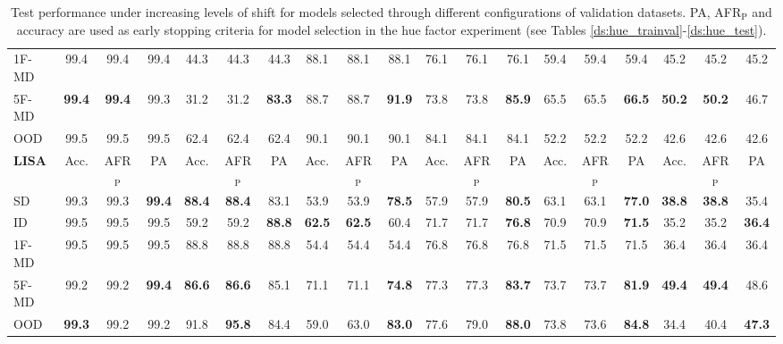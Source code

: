 \begin{table}[H]
{\begin{tabular}{l|ccc|ccc|ccc|ccc|ccc|ccc}
    1F-MD & 99.4 & 99.4 & 99.4 & 44.3 & 44.3 & 44.3 & 88.1 & 88.1 & 88.1 & 76.1 & 76.1 & 76.1 & 59.4 & 59.4 & 59.4 & 45.2 & 45.2 & 45.2 \\
    5F-MD & {\textbf{99.4}} & \textbf{99.4} & 99.3 & 31.2 & 31.2 & {\textbf{83.3}} & 88.7 & 88.7 & {\textbf{91.9}} & 73.8 & 73.8 & {\textbf{85.9}} & 65.5 & 65.5 & {\textbf{66.5}} & {\textbf{50.2}} & \textbf{50.2} & 46.7 \\
    OOD & 99.5 & 99.5 & 99.5 & 62.4 & 62.4 & 62.4 & 90.1 & 90.1 & 90.1 & 84.1 & 84.1 & 84.1 & 52.2 & 52.2 & 52.2 & 42.6 & 42.6 & 42.6 \\
    \midrule
    \addlinespace
    \addlinespace
    \textbf{{\color{tab:green} \textbf{LISA}}} & Acc. & AFR$_\text{P}$ & PA & Acc. & AFR$_\text{P}$ & PA & Acc. & AFR$_\text{P}$ & PA & Acc. & AFR$_\text{P}$ & PA & Acc. & AFR$_\text{P}$ & PA & Acc. & AFR$_\text{P}$ & PA \\
    \midrule
    SD & 99.3 & 99.3 & {\textbf{99.4}} & {\textbf{88.4}} & \textbf{88.4} & 83.1 & 53.9 & 53.9 & {\textbf{78.5}} & 57.9 & 57.9 & {\textbf{80.5}} & 63.1 & 63.1 & {\textbf{77.0}} & {\textbf{38.8}} & \textbf{38.8} & 35.4 \\
    ID & 99.5 & 99.5 & 99.5 & 59.2 & 59.2 & {\textbf{88.8}} & {\textbf{62.5}} & \textbf{62.5} & 60.4 & 71.7 & 71.7 & {\textbf{76.8}} & 70.9 & 70.9 & {\textbf{71.5}} & 35.2 & 35.2 & {\textbf{36.4}} \\
    1F-MD & 99.5 & 99.5 & 99.5 & 88.8 & 88.8 & 88.8 & 54.4 & 54.4 & 54.4 & 76.8 & 76.8 & 76.8 & 71.5 & 71.5 & 71.5 & 36.4 & 36.4 & 36.4 \\
    5F-MD & 99.2 & 99.2 & {\textbf{99.4}} & {\textbf{86.6}} & \textbf{86.6} & 85.1 & 71.1 & 71.1 & {\textbf{74.8}} & 77.3 & 77.3 & {\textbf{83.7}} & 73.7 & 73.7 & {\textbf{81.9}} & {\textbf{49.4}} & \textbf{49.4} & 48.6 \\
    OOD & {\textbf{99.3}} & 99.2 & 99.2 & 91.8 & {\textbf{95.8}} & 84.4 & 59.0 & 63.0 & {\textbf{83.0}} & 77.6 & 79.0 & {\textbf{88.0}} & 73.8 & 73.6 & {\textbf{84.8}} & 34.4 & 40.4 & {\textbf{47.3}} \\
    \bottomrule
\end{tabular}%
}
\caption{
    Test performance under increasing levels of shift for models selected through different configurations of 
    validation datasets. PA, AFR$_{\text{P}}$ and accuracy are used as early stopping criteria for model selection
    in the hue factor experiment (see Tables \ref{ds:hue_trainval}-\ref{ds:hue_test}).}
\label{tab:dg_hue_notpaired}
\end{table}

